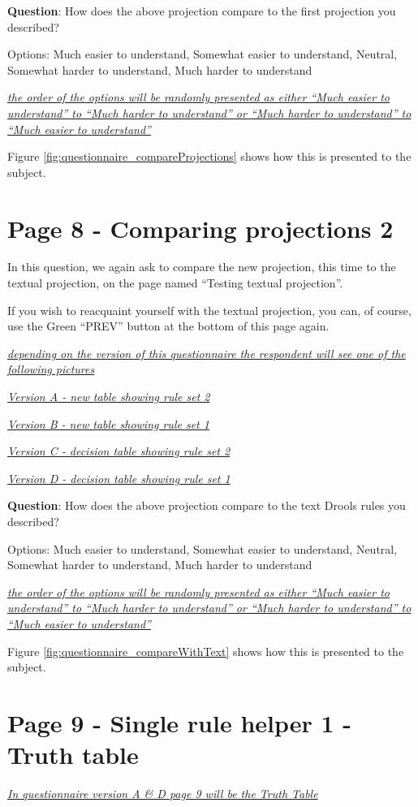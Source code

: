 \textbf{Question}: How does the above projection compare to the first projection you described?

Options: Much easier to understand, Somewhat easier to understand, Neutral, Somewhat harder to understand, Much harder to understand

\emph{\underline{the order of the options will be randomly presented as either ``Much easier to understand'' to ``Much harder to understand'' or ``Much harder to understand'' to ``Much easier to understand'' }}

Figure \ref{fig:questionnaire_compareProjections} shows how this is presented to the subject.

\section*{Page 8 - Comparing projections 2}

In this question, we again ask to compare the new projection, this time to the textual projection, on the page named ``Testing textual projection''.

If you wish to reacquaint yourself with the textual projection, you can, of course, use the Green ``PREV'' button at the bottom of this page again.

\emph{\underline{depending on the version of this questionnaire the respondent will see one of the following pictures}}

\emph{\underline{Version A - new table showing rule set 2}}

\emph{\underline{Version B - new table showing rule set 1}}

\emph{\underline{Version C - decision table showing rule set 2}}

\emph{\underline{Version D - decision table showing rule set 1}}

\textbf{Question}: How does the above projection compare to the text Drools rules you described?

Options: Much easier to understand, Somewhat easier to understand, Neutral, Somewhat harder to understand, Much harder to understand

\emph{\underline{the order of the options will be randomly presented as either ``Much easier to understand'' to ``Much harder to understand'' or ``Much harder to understand'' to ``Much easier to understand'' }}

Figure \ref{fig:questionnaire_compareWithText} shows how this is presented to the subject.

\section*{Page 9 - Single rule helper 1 - Truth table}
\emph{\underline{In questionnaire version A \& D page 9 will be the Truth Table}}

